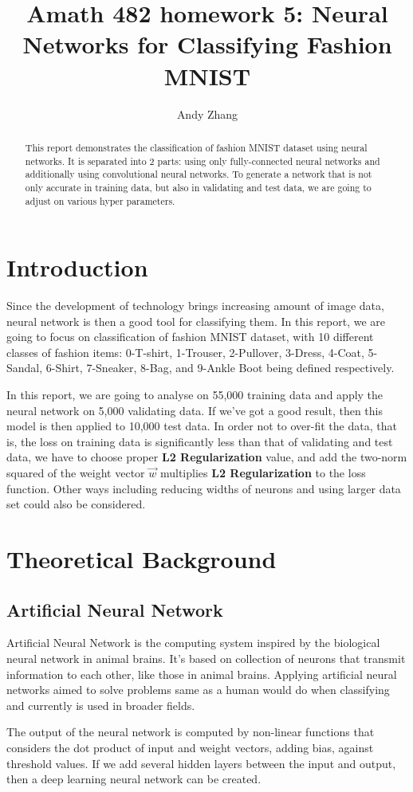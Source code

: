 \documentclass[10pt]{article}
\begin{document}
\title{Amath 482 homework 5: Neural Networks for Classifying Fashion MNIST}
\author{Andy Zhang}
\maketitle

\begin{abstract}
This report demonstrates the classification of fashion MNIST dataset using neural networks. It is separated into 2 parts: using only fully-connected neural networks and additionally using convolutional neural networks. To generate a network that is not only accurate in training data, but also in validating and test data, we are going to adjust on various hyper parameters.
\end{abstract}

\section{Introduction}
Since the development of technology brings increasing amount of image data, neural network is then a good tool for classifying them. In this report, we are going to focus on classification of fashion MNIST dataset, with 10 different classes of fashion items: 0-T-shirt, 1-Trouser, 2-Pullover, 3-Dress, 4-Coat, 5-Sandal, 6-Shirt, 7-Sneaker, 8-Bag, and 9-Ankle Boot being defined respectively.
\par
\vskip 0.2cm
In this report, we are going to analyse on 55,000 training data and apply the neural network on 5,000 validating data. If we've got a good result, then this model is then applied to 10,000 test data. In order not to over-fit the data, that is, the loss on training data is significantly less than that of validating and test data, we have to choose proper \textbf{L2 Regularization} value, and add the two-norm squared of the weight vector $\vec{w}$ multiplies \textbf{L2 Regularization} to the loss function. Other ways including reducing widths of neurons and using larger data set could also be considered.

\section{Theoretical Background}
\subsection{Artificial Neural Network}
Artificial Neural Network is the computing system inspired by the biological neural network in animal brains. It's based on collection of neurons that transmit information to each other, like those in animal brains. Applying artificial neural networks aimed to solve problems same as a human would do when classifying and currently is used in broader fields.
\par
\vskip 0.2cm
The output of the neural network is computed by non-linear functions that considers the dot product of input and weight vectors, adding bias, against threshold values. If we add several hidden layers between the input and output, then a deep learning neural network can be created.
\end{document}

